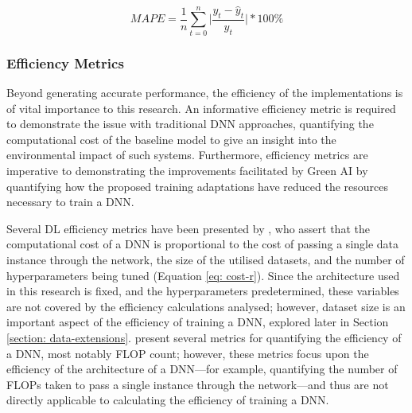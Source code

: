 \documentclass[a4paper, 11pt]{report}
\begin{document}
    \begin{equation}
        \label{eq: mape}
        MAPE = \frac{1}{n} \sum_{t=0}^n \bigg\lvert \frac{y_t - \hat{y}_t}{y_t} \bigg\lvert * 100\%
    \end{equation}


    \subsubsection{Efficiency Metrics}

    Beyond generating accurate performance, the efficiency of the implementations is of vital importance to this research. An informative efficiency metric is required to demonstrate the issue with traditional DNN approaches, quantifying the computational cost of the baseline model to give an insight into the environmental impact of such systems. Furthermore, efficiency metrics are imperative to demonstrating the improvements facilitated by Green AI by quantifying how the proposed training adaptations have reduced the resources necessary to train a DNN. 

    Several DL efficiency metrics have been presented by \citet{schwartz-2019}, who assert that the computational cost of a DNN is proportional to the cost of passing a single data instance through the network, the size of the utilised datasets, and the number of hyperparameters being tuned (Equation \ref{eq: cost-r}). Since the architecture used in this research is fixed, and the hyperparameters predetermined, these variables are not covered by the efficiency calculations analysed; however, dataset size is an important aspect of the efficiency of training a DNN, explored later in Section \ref{section: data-extensions}. \citet{schwartz-2019} present several metrics for quantifying the efficiency of a DNN, most notably FLOP count; however, these metrics focus upon the efficiency of the architecture of a DNN---for example, quantifying the number of FLOPs taken to pass a single instance through the network---and thus are not directly applicable to calculating the efficiency of training a DNN.
\end{document}
